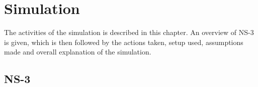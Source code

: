 \chapter{Simulation}
The activities of the simulation is described in this chapter.
An overview of NS-3 is given, which is then followed by the actions taken, setup used, assumptions made and overall explanation of the simulation.
\section{NS-3}
